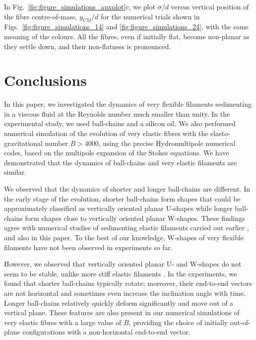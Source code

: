\documentclass{article}
\begin{document}
In Fig.~\ref{fig:figure_simulations_auxplot}c, we plot %
$\sigma/d$ 
versus vertical position of the fibre centre-of-mass, $y_{CM}/d$
for the numerical trials shown in Figs.~\ref{fig:figure_simulations_14} and \ref{fig:figure_simulations_24}, %
with the same meaning of the colours. All the fibres, even if initially flat, become non-planar as they settle down, and their non-flatness is pronounced.











  
\section{Conclusions}
In this paper, we investigated the dynamics of very flexible filaments sedimenting in a viscous fluid at the Reynolds number much smaller than unity. 
In the experimental study, we used ball-chains and a silicon oil. We also performed numerical simulation of the evolution of very elastic fibres with the elasto-gravitational number $B > 4000$, using the precise {\sc Hydromultipole} numerical codes, based on the multipole expansion of the Stokes equations. We have demonstrated that the dynamics of ball-chains and very elastic filaments are similar.

We observed that the dynamics of shorter and longer ball-chains are different. In the early stage of the evolution, shorter ball-chains form shapes that could be approximately classified as vertically oriented planar U-shapes while longer ball-chains form shapes close to vertically oriented planar W-shapes. These findings   agree with numerical studies of sedimenting elastic filaments carried out earlier \cite{lagomarsino2005hydrodynamic,saggiorato2015conformations,koshakji2023robust}, and also in this paper. %
To the best of our knowledge, W-shapes of very flexible filaments have not been observed in experiments so far.

However, we observed that vertically oriented planar U- and W-shapes do not seem to be stable, 
unlike 
more stiff elastic filaments \cite{manghi2006,schlagberger2005orientation,lagomarsino2005hydrodynamic,saggiorato2015conformations,marchetti2018deformation}.
In the experiments, we found that shorter ball-chains typically rotate; moreover, their end-to-end vectors are not horizontal and sometimes even increase the inclination angle with time. %
Longer ball-chains relatively quickly deform significantly and move out of a vertical plane. These features are also present in our numerical simulations of very elastic fibres with a large value of $B$, providing the choice of initially out-of-plane configurations with a non-horizontal end-to-end vector. 
\end{document}
